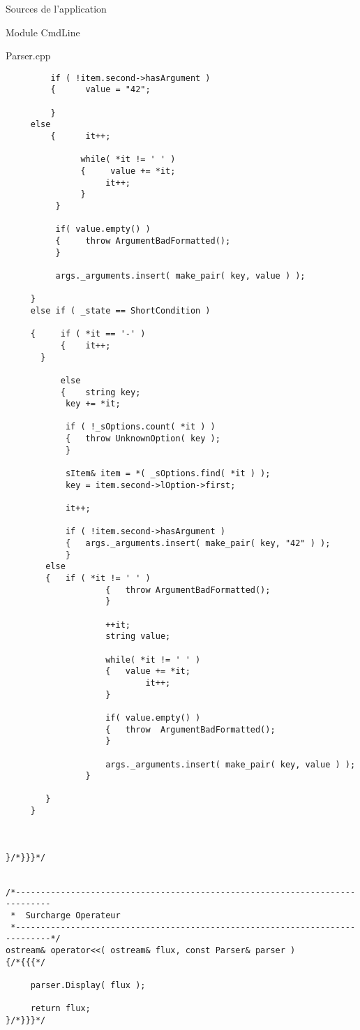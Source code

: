 \documentclass{article}
\begin{document}
\begin{section}{Sources de l'application}
\begin{subsection}{Module CmdLine}
\begin{paragraph}{Parser.cpp}
\begin{verbatim}
         if ( !item.second->hasArgument ) 
         {      value = "42";

         }
	 else 
         {      it++;

               while( *it != ' ' )
               {     value += *it;
                    it++;
               }
          }

          if( value.empty() ) 
          {     throw ArgumentBadFormatted();
          }

          args._arguments.insert( make_pair( key, value ) );

     }
     else if ( _state == ShortCondition ) 

     {     if ( *it == '-' ) 
           {    it++;
	   }
     
     	   else 
     	   {	string key;
           	key += *it;

           	if ( !_sOptions.count( *it ) ) 
           	{	throw UnknownOption( key );
           	}

           	sItem& item = *( _sOptions.find( *it ) );
           	key = item.second->lOption->first;
	
           	it++;
	
           	if ( !item.second->hasArgument ) 
           	{	args._arguments.insert( make_pair( key, "42" ) );
           	}
	   	else
	   	{	if ( *it != ' ' ) 
                	{	throw ArgumentBadFormatted();
                	}
	
                	++it;
                	string value;
	
                	while( *it != ' ' ) 
                	{	value += *it;
                	        it++;
                	}
	
                	if( value.empty() ) 
                	{	throw  ArgumentBadFormatted();
                	}
	
                	args._arguments.insert( make_pair( key, value ) );
     	    	}

     	}
     }



}/*}}}*/


/*-----------------------------------------------------------------------------
 *  Surcharge Operateur
 *-----------------------------------------------------------------------------*/
ostream& operator<<( ostream& flux, const Parser& parser )
{/*{{{*/

     parser.Display( flux );

     return flux;
}/*}}}*/


\end{verbatim}
\end{paragraph}
\end{subsection}
\end{section}
\end{document}
